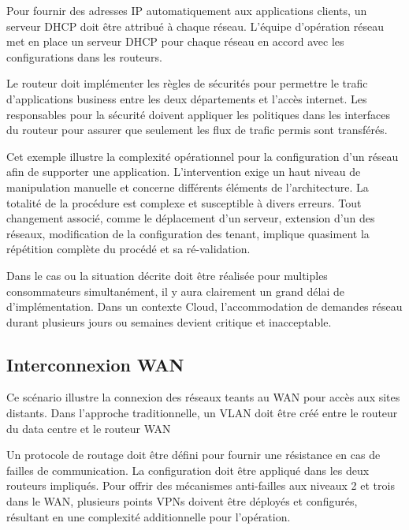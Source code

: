 Pour fournir des adresses IP automatiquement aux applications clients, un serveur DHCP doit être attribué à chaque réseau. L'équipe d'opération réseau met en place un serveur DHCP pour chaque réseau en accord avec les configurations dans les routeurs.

Le routeur doit implémenter les règles de sécurités pour permettre le trafic d'applications business entre les deux départements et l'accès internet. Les responsables pour la sécurité doivent appliquer les politiques dans les interfaces du routeur pour assurer que seulement les flux de trafic permis sont transférés.

Cet exemple illustre la complexité opérationnel pour la configuration d'un réseau afin de supporter une application. L'intervention exige un haut niveau de manipulation manuelle et concerne différents éléments de l'architecture. La totalité de la procédure est complexe et susceptible à divers erreurs. Tout changement associé, comme le déplacement d'un serveur, extension d'un des réseaux, modification de la configuration des tenant, implique quasiment la répétition complète du procédé et sa ré-validation.

Dans le cas ou la situation décrite doit être réalisée pour multiples consommateurs simultanément, il y aura clairement un grand délai de d'implémentation. Dans un contexte Cloud, l'accommodation de demandes réseau durant plusieurs jours ou semaines devient critique et inacceptable. 


\subsection{Interconnexion WAN}

Ce scénario illustre la connexion des réseaux teants au WAN pour accès aux sites distants. Dans l'approche traditionnelle, un VLAN doit être créé entre le routeur du data centre et le routeur WAN



Un protocole de routage doit être défini pour fournir une résistance en cas de failles de communication. La configuration doit être appliqué dans les deux routeurs impliqués. Pour offrir des mécanismes anti-failles aux niveaux 2 et trois dans le WAN, plusieurs points VPNs doivent être déployés et configurés, résultant en une complexité additionnelle pour l'opération.

